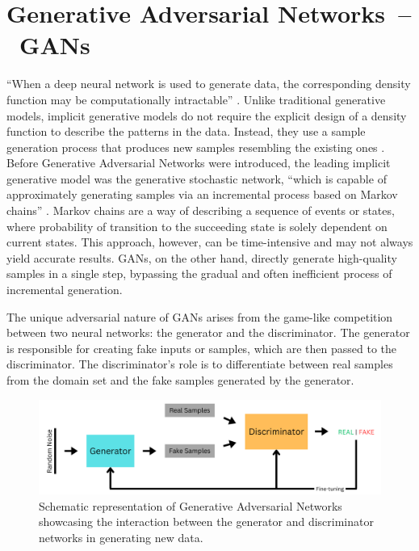 \section{Generative Adversarial Networks~--~GANs}\label{GAN}

``When a deep neural network is used to generate data, the corresponding density function may be computationally intractable'' \citep{goodfellowGAN}. Unlike traditional generative models, implicit generative models do not require the explicit design of a density function to describe the patterns in the data. Instead, they use a sample generation process that produces new samples resembling the existing ones \citep{goodfellowGAN}. Before Generative Adversarial Networks were introduced, the leading implicit generative model was the generative stochastic network, ``which is capable of approximately generating samples via an incremental process based on Markov chains'' \citep{goodfellowGAN}. Markov chains are a way of describing a sequence of events or states, where probability of transition to the succeeding state is solely dependent on current states. This approach, however, can be time-intensive and may not always yield accurate results. GANs, on the other hand, directly generate high-quality samples in a single step, bypassing the gradual and often inefficient process of incremental generation.

The unique adversarial nature of GANs arises from the game-like competition between two neural networks: the generator and the discriminator. The generator is responsible for creating fake inputs or samples, which are then passed to the discriminator. The discriminator's role is to differentiate between real samples from the domain set and the fake samples generated by the generator.

\begin{figure}[ht]
\centering
  \includegraphics[width=1\columnwidth]{figures/basics/GAN.png}
  \caption{Schematic representation of Generative Adversarial Networks showcasing the interaction between the generator and discriminator networks in generating new data.}\label{fig:figureGAN}
\end{figure}

